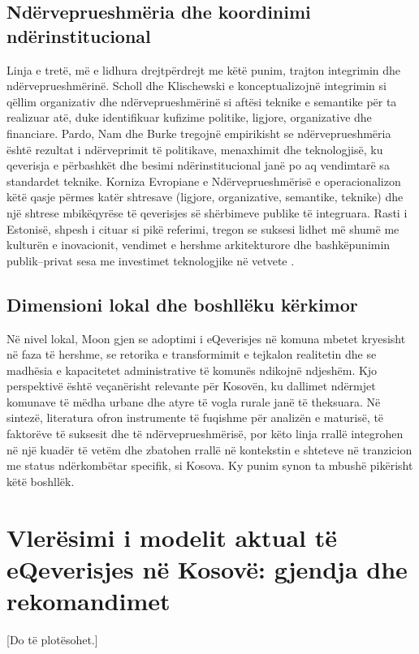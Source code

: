 \documentclass[conference]{IEEEtran}
\begin{document}
\subsection{Ndërveprueshmëria dhe koordinimi ndërinstitucional}
Linja e tretë, më e lidhura drejtpërdrejt me këtë punim, trajton integrimin
dhe ndërveprueshmërinë. Scholl dhe Klischewski \cite{scholl2007} e
konceptualizojnë integrimin si qëllim organizativ dhe ndërveprueshmërinë si
aftësi teknike e semantike për ta realizuar atë, duke identifikuar
kufizime politike, ligjore, organizative dhe financiare. Pardo, Nam dhe
Burke \cite{pardo2012} tregojnë empirikisht se ndërveprueshmëria është
rezultat i ndërveprimit të politikave, menaxhimit dhe teknologjisë, ku
qeverisja e përbashkët dhe besimi ndërinstitucional janë po aq vendimtarë
sa standardet teknike. Korniza Evropiane e Ndërveprueshmërisë
\cite{eif2017} e operacionalizon këtë qasje përmes katër shtresave
(ligjore, organizative, semantike, teknike) dhe një shtrese mbikëqyrëse të
qeverisjes së shërbimeve publike të integruara. Rasti i Estonisë, shpesh i
cituar si pikë referimi, tregon se suksesi lidhet më shumë me kulturën e
inovacionit, vendimet e hershme arkitekturore dhe bashkëpunimin
publik--privat sesa me investimet teknologjike në vetvete
\cite{kalvet2012}.

\subsection{Dimensioni lokal dhe boshllëku kërkimor}
Në nivel lokal, Moon \cite{moon2002} gjen se adoptimi i eQeverisjes në
komuna mbetet kryesisht në faza të hershme, se retorika e transformimit e
tejkalon realitetin dhe se madhësia e kapacitetet administrative të
komunës ndikojnë ndjeshëm. Kjo perspektivë është veçanërisht relevante për
Kosovën, ku dallimet ndërmjet komunave të mëdha urbane dhe atyre të vogla
rurale janë të theksuara. Në sintezë, literatura ofron instrumente të
fuqishme për analizën e maturisë, të faktorëve të suksesit dhe të
ndërveprueshmërisë, por këto linja rrallë integrohen në një kuadër të
vetëm dhe zbatohen rrallë në kontekstin e shteteve në tranzicion me status
ndërkombëtar specifik, si Kosova. Ky punim synon ta mbushë pikërisht këtë
boshllëk.

\section{Vlerësimi i modelit aktual të eQeverisjes në Kosovë: gjendja dhe
rekomandimet}
\label{sec:vleresimi}
[Do të plotësohet.]
\end{document}
